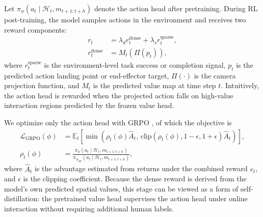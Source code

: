 \documentclass{article}
\begin{document}
Let $\pi_\phi(a_t \mid \mathcal{H}_t, m_{t+1:t+h})$ denote the action head after pretraining. During RL post-training, the model samples actions in the environment and receives two reward components:
\begin{equation}
\begin{aligned}
r_t &= \lambda_d r_t^{\mathrm{dense}} + \lambda_s r_t^{\mathrm{sparse}},\\
r_t^{\mathrm{dense}} &= M_t(\Pi(p_t)),
\end{aligned}
\end{equation}
where $r_t^{\mathrm{sparse}}$ is the environment-level task success or completion signal, $p_t$ is the predicted action landing point or end-effector target, $\Pi(\cdot)$ is the camera projection function, and $M_t$ is the predicted value map at time step $t$. Intuitively, the action head is rewarded when the projected action falls on high-value interaction regions predicted by the frozen value head.

We optimize only the action head with GRPO \cite{shao2024deepseekmath}, of which the objective is
\begin{equation}
\begin{aligned}
\mathcal{L}_{\mathrm{GRPO}}(\phi)
&=
\mathbb{E}_t \left[
\min\!\left(
\rho_t(\phi)\hat{A}_t,\,
\mathrm{clip}\!\left(\rho_t(\phi), 1-\epsilon, 1+\epsilon\right)\hat{A}_t
\right)
\right],\\
\rho_t(\phi)
&=
\frac{\pi_\phi(a_t \mid \mathcal{H}_t, m_{t+1:t+h})}
{\pi_{\phi_{\mathrm{old}}}(a_t \mid \mathcal{H}_t, m_{t+1:t+h})},
\end{aligned}
\end{equation}
where $\hat{A}_t$ is the advantage estimated from returns under the combined reward $r_t$, and $\epsilon$ is the clipping coefficient. Because the dense reward is derived from the model's own predicted spatial values, this stage can be viewed as a form of self-distillation: the pretrained value head supervises the action head under online interaction without requiring additional human labels.
\end{document}
